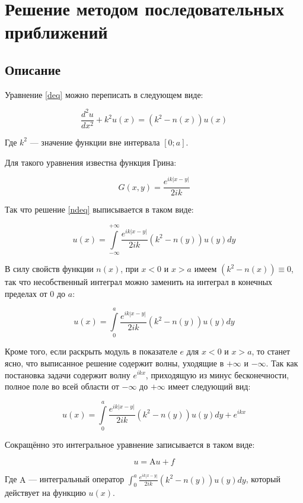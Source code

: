 \documentclass{article}
\providecommand{\abs}[1]{\left \lvert{#1}\right \rvert}
\providecommand{\op}[1]{\mathrm{#1}}
\numberwithin{equation}{section}
\begin{document}
\newpage
\section{Решение методом последовательных приближений}

\subsection{Описание}

Уравнение \eqref{deq} можно переписать в следующем виде:

\begin{equation}\label{ndeq}
\frac{d^2u}{dx^2} + k^2 u(x) = (k^2 - n(x)) u(x)
\end{equation}

Где $k^2$ — значение функции вне интервала $[0; a]$.

Для такого уравнения известна функция Грина:

\[
G(x, y) = \frac{e^{ik\abs{x-y}}}{2ik}
\]

Так что решение \eqref{ndeq} выписывается в таком виде:

\[
u(x) = \int \limits_{-\infty}^{+\infty} {\frac{e^{ik\abs{x-y}}}{2ik} (k^2-n(y))
  u(y) dy}
\]

В силу свойств функции $n(x)$, при $x < 0$ и $x > a$ имеем $(k^2 -
n(x)) \equiv 0$, так что несобственный интеграл можно заменить на
интеграл в конечных пределах от $0$ до $a$:

\[
u(x) = \int \limits_{0}^{a} {\frac{e^{ik\abs{x-y}}}{2ik} (k^2-n(y))
  u(y) dy}
\]

Кроме того, если раскрыть модуль в показателе $e$ для $x<0$ и $x>a$,
то станет ясно, что выписанное решение содержит волны, уходящие в
$+\infty$ и $-\infty$. Так как постановка задачи содержит волну
$e^{ikx}$, приходящую из минус бесконечности, полное поле во всей
области от $-\infty$ до $+\infty$ имеет следующий вид:

\begin{equation}\label{inteq}
u(x) =  \int \limits_{0}^{a} {\frac{e^{ik\abs{x-y}}}{2ik} (k^2-n(y))
  u(y) dy} + e^{ikx}
\end{equation}

Сокращённо это интегральное уравнение записывается в таком виде:

\begin{equation}\label{inteq-short}
u = \op{A}u + f
\end{equation}

Где $\op{A}$ — интегральный оператор $\int_{0}^{a}
{\frac{e^{ik\abs{x-y}}}{2ik} (k^2-n(y)) u(y) dy}$, который действует на
функцию $u(x)$.
\end{document}
